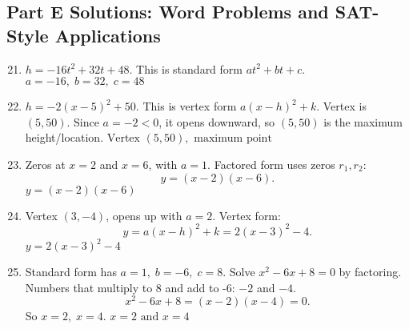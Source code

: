 \documentclass[12pt]{article}
\begin{document}
\subsection*{Part E Solutions: Word Problems and SAT-Style Applications}
\begin{enumerate}
  \setcounter{enumi}{20}
  \item \(h = -16t^2 + 32t + 48.\)  
  This is standard form \(at^2 + bt + c.\)  
  \(\boxed{a = -16,\; b = 32,\; c = 48}\)

  \item \(h = -2(x - 5)^2 + 50.\)  
  This is vertex form \(a(x - h)^2 + k.\)  
  Vertex is \((5, 50)\).  
  Since \(a = -2 < 0\), it opens downward, so \((5, 50)\) is the maximum height/location.  
  \(\boxed{\text{Vertex } (5, 50), \text{ maximum point}}\)

  \item Zeros at \(x = 2\) and \(x = 6\), with \(a = 1.\)  
  Factored form uses zeros \(r_1, r_2\):  
  \[
  y = (x - 2)(x - 6).
  \]
  \(\boxed{y = (x - 2)(x - 6)}\)

  \item Vertex \((3, -4)\), opens up with \(a = 2.\)  
  Vertex form:  
  \[
  y = a(x - h)^2 + k = 2(x - 3)^2 - 4.
  \]
  \(\boxed{y = 2(x - 3)^2 - 4}\)

  \item Standard form has \(a = 1,\; b = -6,\; c = 8.\)  
  Solve \(x^2 - 6x + 8 = 0\) by factoring.  
  Numbers that multiply to 8 and add to -6: \(-2\) and \(-4.\)  
  \[
  x^2 - 6x + 8 = (x - 2)(x - 4) = 0.
  \]
  So \(x = 2,\; x = 4.\)  
  \(\boxed{x = 2 \text{ and } x = 4}\)
\end{enumerate}
\end{document}
